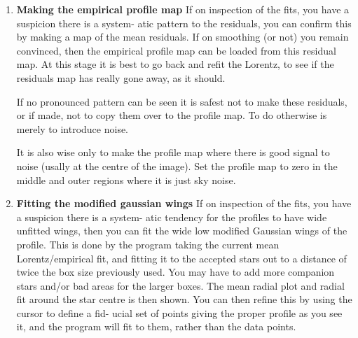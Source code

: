 \begin{small}
{{\begin{enumerate}
 
   In this stage, the area displayed round each star is roughly twice the
   linear size of the area actually used in the fit, so you need not
   worry about bad areas or faint stars near the edge, but stars whose
   profiles get near the central region should be marked.
   You can also mark and remove mistaken points using the cursor in the
   same way.
 
   You can then re-estimate the fit.
 
 \item {\bf Making the empirical profile map}
   If on inspection of the fits, you have a suspicion there is a system-
   atic pattern to the residuals, you can confirm this by making a map
   of the mean residuals. If on smoothing (or not) you remain convinced,
   then the empirical profile map can be loaded from this residual map.
   At this stage it is best to go back and refit the Lorentz, to see if
   the residuals map has really gone away, as it should.
 
   If no pronounced pattern  can be seen it is safest  not to make these
   residuals, or if made, not to copy them over to the profile map. To do
   otherwise is merely to introduce noise.
 
   It is also wise only to make the profile map where there is good
   signal to noise (usally at the centre of the image). Set the profile
   map to zero in the middle and outer regions where it is just sky
   noise.
 
 \item {\bf Fitting the modified gaussian wings}
   If on inspection of the fits, you have a suspicion there is a system-
   atic tendency for the profiles to have wide unfitted wings, then you
   can fit the wide low modified Gaussian wings of the profile. This is
   done by the program taking the current mean Lorentz/empirical fit, and
   fitting it to the accepted stars out to a distance of twice the box
   size previously used.
   You may have to add more companion stars and/or bad areas for the
   larger boxes.
   The mean radial plot and radial fit around the star centre is then
   shown. You can then refine this by using the cursor to define a fid-
   ucial set of points giving the proper profile as you see it, and the
   program will fit to them, rather than the data points.
 

\end{enumerate}}}
\end{small}
